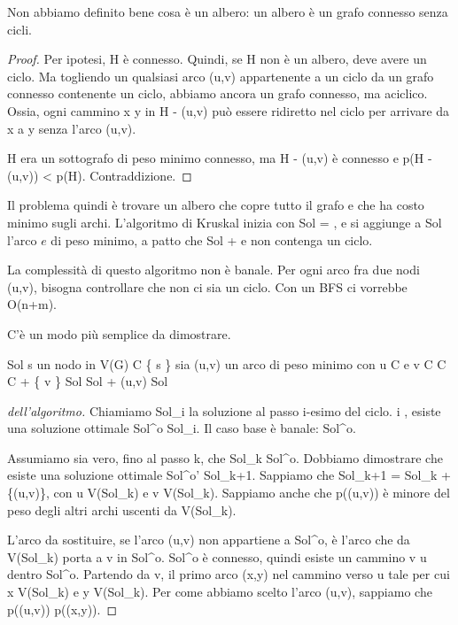 Non abbiamo definito bene cosa \`e un albero: un albero \`e un grafo connesso senza cicli.

\begin{proof}
Per ipotesi, H \`e connesso. Quindi, se H non \`e un albero, deve avere un ciclo. Ma togliendo un qualsiasi arco (u,v) appartenente a un ciclo da un grafo connesso contenente un ciclo, abbiamo ancora un grafo connesso, ma aciclico. Ossia, ogni cammino x \to y in H - (u,v) pu\`o essere ridiretto nel ciclo per arrivare da x a y senza l'arco (u,v).

H era un sottografo di peso minimo connesso, ma H - (u,v) \`e connesso e p(H - (u,v)) < p(H). Contraddizione.
\end{proof}

Il problema quindi \`e trovare un albero che copre tutto il grafo e che ha costo minimo sugli archi. L'algoritmo di Kruskal inizia con Sol = \emptyset, e si aggiunge a Sol l'arco $e$ di peso minimo, a patto che Sol + e non contenga un ciclo.

La complessit\`a di questo algoritmo non \`e banale. Per ogni arco fra due nodi (u,v), bisogna controllare che non ci sia un ciclo. Con un BFS ci vorrebbe O(n+m).

C'\`e un modo pi\`u semplice da dimostrare.

\begin{algorithm}
\begin{algorithmic}
    \State Sol \gets \emptyset
    \State s \gets un nodo in V(G)
    \State C \gets \{ s \}
        \State sia (u,v) un arco di peso minimo con u \in C e v \ni C
        \State C \gets C + \{ v \}
        \State Sol \gets Sol + (u,v)
    \EndWhile
    \Return Sol
\EndFunction
\end{algorithmic}
\end{algorithm} 

\begin{proof}[dell'algoritmo]
Chiamiamo Sol_i la soluzione al passo i-esimo del ciclo. \forall i , esiste una soluzione ottimale Sol^{o} \supseteq Sol_i. Il caso base \`e banale: \emptyset \subseteq Sol^{o}.

Assumiamo sia vero, fino al passo k, che Sol_k \subseteq Sol^{o}. Dobbiamo dimostrare che esiste una soluzione ottimale Sol^{o'} \supseteq Sol_{k+1}. Sappiamo che Sol_{k+1} = Sol_k + \{(u,v)\}, con u \in V(Sol_k) e v \ni V(Sol_k). Sappiamo anche che p((u,v)) \`e minore del peso degli altri archi uscenti da V(Sol_k).

L'arco da sostituire, se l'arco (u,v) non appartiene a Sol^{o}, \`e l'arco che da V(Sol_k) porta a v in Sol^{o}. Sol^{o} \`e connesso, quindi esiste un cammino v \to u dentro Sol^{o}. Partendo da v, il primo arco (x,y) nel cammino verso u tale per cui x \in V(Sol_k) e y \ni V(Sol_k). Per come abbiamo scelto l'arco (u,v), sappiamo che p((u,v)) \le p((x,y)).
\end{proof}

